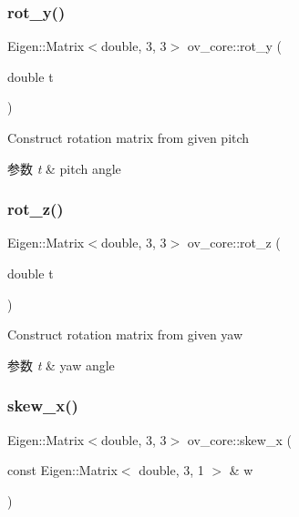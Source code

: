 \subsubsection{\texorpdfstring{rot\+\_\+y()}{rot\_y()}}
{\footnotesize\ttfamily Eigen\+::\+Matrix$<$double, 3, 3$>$ ov\+\_\+core\+::rot\+\_\+y (\begin{DoxyParamCaption}\item[{double}]{t }\end{DoxyParamCaption})\hspace{0.3cm}{\ttfamily [inline]}}



Construct rotation matrix from given pitch 


\begin{DoxyParams}{参数}
{\em t} & pitch angle \\
\hline
\end{DoxyParams}
\mbox{\label{namespaceov__core_a512a53c9e1519a8e202277db433d37d1}} 
\subsubsection{\texorpdfstring{rot\+\_\+z()}{rot\_z()}}
{\footnotesize\ttfamily Eigen\+::\+Matrix$<$double, 3, 3$>$ ov\+\_\+core\+::rot\+\_\+z (\begin{DoxyParamCaption}\item[{double}]{t }\end{DoxyParamCaption})\hspace{0.3cm}{\ttfamily [inline]}}



Construct rotation matrix from given yaw 


\begin{DoxyParams}{参数}
{\em t} & yaw angle \\
\hline
\end{DoxyParams}
\mbox{\label{namespaceov__core_a24012c54df35621a935655b2e230169d}} 
\subsubsection{\texorpdfstring{skew\+\_\+x()}{skew\_x()}}
{\footnotesize\ttfamily Eigen\+::\+Matrix$<$double, 3, 3$>$ ov\+\_\+core\+::skew\+\_\+x (\begin{DoxyParamCaption}\item[{const Eigen\+::\+Matrix$<$ double, 3, 1 $>$ \&}]{w }\end{DoxyParamCaption})\hspace{0.3cm}{\ttfamily [inline]}}



